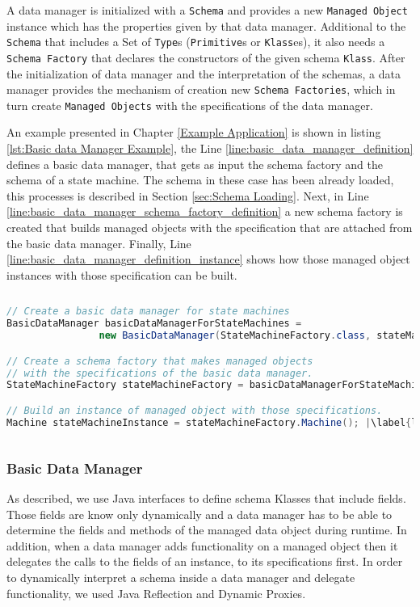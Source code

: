 A data manager is initialized with a \texttt{Schema} and provides a new \texttt{Managed Object} instance which has the properties given by that data manager.
Additional to the \texttt{Schema} that includes a Set of \texttt{Type}s (\texttt{Primitive}s or \texttt{Klass}es), it also needs a \texttt{Schema Factory} that declares the constructors of the given schema \texttt{Klass}.
After the initialization of data manager and the interpretation of the schemas, a data manager provides the mechanism of creation new  \texttt{Schema Factories}, which in turn create  \texttt{Managed Objects} with the specifications of the data manager.

An example presented in Chapter \ref{Example Application} is shown in listing \ref{lst:Basic data Manager Example}, the Line \ref{line:basic_data_manager_definition} defines a basic data manager, that gets as input the schema factory and the schema of a state machine. 
The schema in these case has been already loaded, this processes is described in Section \ref{sec:Schema Loading}.
Next, in Line \ref{line:basic_data_manager_schema_factory_definition} a new schema factory is created that builds managed objects with the specification that are attached from the basic data manager.
Finally, Line \ref{line:basic_data_manager_definition_instance} shows how those managed object instances with those specification can be built.

\begin{sourcecode} [H]
	\begin{lstlisting}[language=Java, escapechar=|]
// Create a basic data manager for state machines
BasicDataManager basicDataManagerForStateMachines = 
				new BasicDataManager(StateMachineFactory.class, stateMachineSchema); |\label{line:basic_data_manager_definition}|

// Create a schema factory that makes managed objects 
// with the specifications of the basic data manager.
StateMachineFactory stateMachineFactory = basicDataManagerForStateMachines.make(); |\label{line:basic_data_manager_schema_factory_definition}|

// Build an instance of managed object with those specifications.
Machine stateMachineInstance = stateMachineFactory.Machine(); |\label{line:basic_data_manager_definition_instance}|
	\end{lstlisting}
	\caption{Basic data Manager Example}
	\label{lst:Basic data Manager Example}
\end{sourcecode}

\subsubsection{Basic Data Manager}
As described, we use Java interfaces to define schema Klasses that include fields. 
Those fields are know only dynamically and a data manager has to be able to determine the fields and methods of the managed data object during runtime.
In addition, when a data manager adds functionality on a managed object then it delegates the calls to the fields of an instance, to its specifications first.
In order to dynamically interpret a schema inside a data manager and delegate functionality, we used Java Reflection and Dynamic Proxies.

